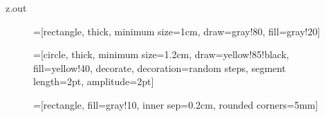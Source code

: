 \begin{VerbatimOut}{z.out}
\begin{figure}[htbp]
=[rectangle,
                                    thick,
                                    minimum size=1cm,
                                    draw=gray!80,
                                    fill=gray!20]

=[circle,
                                    thick,
                                    minimum size=1.2cm,
                                    draw=yellow!85!black,
                                    fill=yellow!40,
                                    decorate,
                                    decoration={random steps,
                                                            segment length=2pt,
                                                            amplitude=2pt}]

=[rectangle,
                                                fill=gray!10,
                                                inner sep=0.2cm,
                                                rounded corners=5mm]

\begin{tikzpicture}[>=latex,text height=1.5ex,text depth=0.25ex]
  

\end{tikzpicture}
\end{figure}
\end{VerbatimOut}
